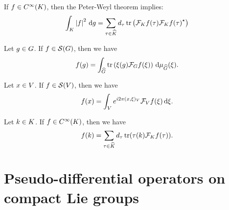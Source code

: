 \begin{example}
    If $f \in \SmoothFunctions{\CompactGroup}$,
    then the Peter-Weyl theorem implies:
    \begin{align*}
        \int_\CompactGroup \abs{f}^2 \dd g
        = \sum_{\tau \in \dualGroup\CompactGroup}
            \dimRep\tau
            \tr \left(
                \Fourier[\CompactGroup] f(\tau)
                \adj{\Fourier[\CompactGroup] f(\tau)}
            \right)
    \end{align*}
\end{example}

\begin{proposition}
    Let $g \in \Group$.
    If $f \in \Schwartz\Group$,
    then we have
    \begin{align*}
        f(g) =
        \int_\dualGroup\Group
            \tr\left(
                \xi(g)
                \Fourier f(\xi)
            \right)
        \dd \Plancherel\Group(\xi).
    \end{align*}
\end{proposition}

\begin{example}
    Let $x \in \VectorSpace$.
    If $f \in \Schwartz\VectorSpace$,
    then we have
    \begin{align*}
        f(x) =
        \int_\VectorSpace
            \e^{\i \turn \ip{x}{\xi}} \Fourier[\VectorSpace] f(\xi)
        \dd \xi.
    \end{align*}
\end{example}

\begin{example}
    Let $k \in \CompactGroup$.
    If $f \in \SmoothFunctions\CompactGroup$,
    then we have
    \begin{align*}
        f(k) =
        \sum_{\tau \in \dualGroup\CompactGroup}
            \dimRep\tau
            \tr(\tau(k) \Fourier[\CompactGroup] f(\tau)).
    \end{align*}
\end{example}

\section{Pseudo-differential operators on compact Lie groups}

